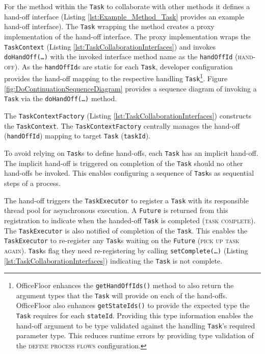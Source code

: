 \documentclass[prodmode]{style/acmlarge}
\begin{document}
For the method within the \texttt{Task} to collaborate with other methods it
defines a hand-off interface (Listing \ref{lst:Example_Method_Task} provides an
example hand-off interface).  The \texttt{Task} wrapping the method creates a
proxy implementation of the hand-off interface.  The proxy implementation wraps
the \texttt{TaskContext} (Listing \ref{lst:TaskCollaborationInterfaces}) and
invokes \texttt{doHandOff(\ldots)} with the invoked interface method name as the
\texttt{handOffId} (\textsc{hand-off}).  As the \texttt{handOffId}s are static
for each \texttt{Task}, developer configuration provides the hand-off mapping to
the respective handling \texttt{Task}\footnote{OfficeFloor enhances the
\texttt{getHandOffIds()} method to also return the argument types that the
\texttt{Task} will provide on each of the hand-offs.  OfficeFloor also enhances
\texttt{getStateIds()} to provide the expected type the \texttt{Task} requires
for each \texttt{stateId}. Providing this type information enables the hand-off
argument to be type validated against the handling \texttt{Task}'s required
parameter type.  This reduces runtime errors by providing type validation of the
\textsc{define process flows} configuration.}.  Figure
\ref{fig:DoContinuationSequenceDiagram} provides a sequence diagram of invoking
a \texttt{Task} via the \texttt{doHandOff(\ldots)} method.

The \texttt{TaskContextFactory} (Listing \ref{lst:TaskCollaborationInterfaces})
constructs the \texttt{TaskContext}.  The \texttt{TaskContextFactory} centrally
manages the hand-off (\texttt{handOffId}) mapping to target \texttt{Task}
(\texttt{taskId}).

To avoid relying on \texttt{Task}s to define hand-offs, each \texttt{Task} has
an implicit hand-off.  The implicit hand-off is triggered on completion of the
\texttt{Task} should no other hand-offs be invoked.  This enables configuring a
sequence of \texttt{Task}s as sequential steps of a process.

The hand-off triggers the \texttt{TaskExecutor} to register a \texttt{Task} with
its responsible thread pool for asynchronous execution.  A \texttt{Future} is
returned from this registration to indicate when the handed-off \texttt{Task} is
completed (\textsc{task complete}).  The \texttt{TaskExecutor} is also notified
of completion of the \texttt{Task}.  This enables the \texttt{TaskExecutor} to
re-register any \texttt{Task}s waiting on the \texttt{Future} (\textsc{pick up
task again}).  \texttt{Task}s flag they need re-registering by calling
\texttt{setComplete(\ldots)} (Listing \ref{lst:TaskCollaborationInterfaces})
indicating the \texttt{Task} is not complete.
\end{document}
